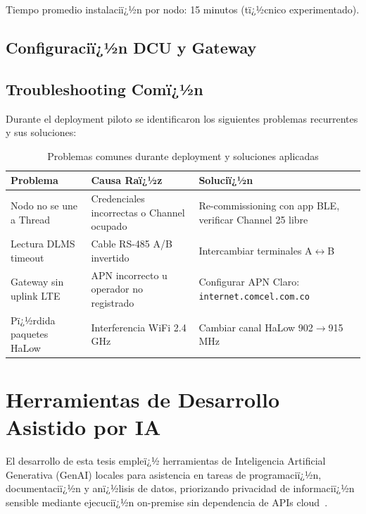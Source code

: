 Tiempo promedio instalaciï¿½n por nodo: 15 minutos (tï¿½cnico experimentado).


\subsection{Configuraciï¿½n DCU y Gateway}


\subsection{Troubleshooting Comï¿½n}

Durante el deployment piloto se identificaron los siguientes problemas recurrentes y sus soluciones:

\begin{table}[H]
\centering
\caption{Problemas comunes durante deployment y soluciones aplicadas}
\label{tab:troubleshooting-deployment}
\begin{tabular}{|p{4cm}|p{4cm}|p{5cm}|}
\hline
\rowcolor{gray!20}
\textbf{Problema} & \textbf{Causa Raï¿½z} & \textbf{Soluciï¿½n} \\
\hline
Nodo no se une a Thread & Credenciales incorrectas o Channel ocupado & Re-commissioning con app BLE, verificar Channel 25 libre \\
\hline
Lectura DLMS timeout & Cable RS-485 A/B invertido & Intercambiar terminales A$\leftrightarrow$B \\
\hline
Gateway sin uplink LTE & APN incorrecto u operador no registrado & Configurar APN Claro: \texttt{internet.comcel.com.co} \\
\hline
Pï¿½rdida paquetes HaLow & Interferencia WiFi 2.4 GHz & Cambiar canal HaLow 902$\rightarrow$915 MHz \\
\hline
\end{tabular}
\end{table}

\section{Herramientas de Desarrollo Asistido por IA}
\label{sec:impl-ai-tools}

El desarrollo de esta tesis empleï¿½ herramientas de Inteligencia Artificial Generativa (GenAI) locales para asistencia en tareas de programaciï¿½n, documentaciï¿½n y anï¿½lisis de datos, priorizando privacidad de informaciï¿½n sensible mediante ejecuciï¿½n on-premise sin dependencia de APIs cloud~\cite{openaiGPT42024,metaLlama32024}.


